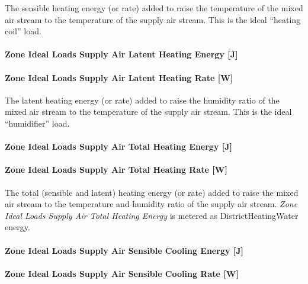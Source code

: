 The sensible heating energy (or rate) added to raise the temperature of the mixed air stream to the temperature of the supply air stream. This is the ideal ``heating coil'' load.

\paragraph{Zone Ideal Loads Supply Air Latent Heating Energy {[}J{]}}\label{zone-ideal-loads-supply-air-latent-heating-energy-j}

\paragraph{Zone Ideal Loads Supply Air Latent Heating Rate {[}W{]}}\label{zone-ideal-loads-supply-air-latent-heating-rate-w}

The latent heating energy (or rate) added to raise the humidity ratio of the mixed air stream to the temperature of the supply air stream. This is the ideal ``humidifier'' load.

\paragraph{Zone Ideal Loads Supply Air Total Heating Energy {[}J{]}}\label{zone-ideal-loads-supply-air-total-heating-energy-j}

\paragraph{Zone Ideal Loads Supply Air Total Heating Rate {[}W{]}}\label{zone-ideal-loads-supply-air-total-heating-rate-w}

The total (sensible and latent) heating energy (or rate) added to raise the mixed air stream to the temperature and humidity ratio of the supply air stream. \emph{Zone Ideal Loads Supply Air Total Heating Energy} is metered as DistrictHeatingWater energy.

\paragraph{Zone Ideal Loads Supply Air Sensible Cooling Energy {[}J{]}}\label{zone-ideal-loads-supply-air-sensible-cooling-energy-j}

\paragraph{Zone Ideal Loads Supply Air Sensible Cooling Rate {[}W{]}}\label{zone-ideal-loads-supply-air-sensible-cooling-rate-w}

